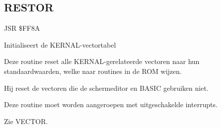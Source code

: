 
\newpage
\subsection{RESTOR}
\label{KERNAL Jump Table!RESTOR}
\begin{description}[leftmargin=2cm,style=nextline]
    \item [Adres:] JSR \$FF8A    \item [Omschrijving:] Initialiseert de KERNAL-vectortabel    \item [Opmerkingen:]        Deze routine reset alle KERNAL-gerelateerde vectoren naar hun standaardwaarden, welke naar routines in de ROM wijzen.

        Hij reset de vectoren die de schermeditor en BASIC gebruiken niet.

        Deze routine moet worden aangeroepen met uitgeschakelde interrupts.

        Zie VECTOR.    \item [Voorbeeld:]
\end{description}



\newpage
